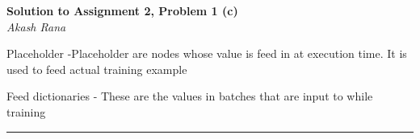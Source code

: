 \documentclass[letter,12pt]{article}
\newcommand{\myhwtitle}[3]
{\begin{center}
{\large {\bf Solution to Assignment {#1}, Problem {#2}}}\\
\medskip
{\it {#3}} %
\end{center}}
\newcommand{\solutionsAuthor}{Akash Rana}
\begin{document}
\myhwtitle{2}{1 (c)}{\solutionsAuthor}

\bigskip
Placeholder -Placeholder are nodes whose value is feed in at execution time. It is used to feed actual training example

Feed dictionaries - These are the values in batches that are input to while training 

\noindent\rule{\textwidth}{0.4pt}

\clearpage
\end{document}
